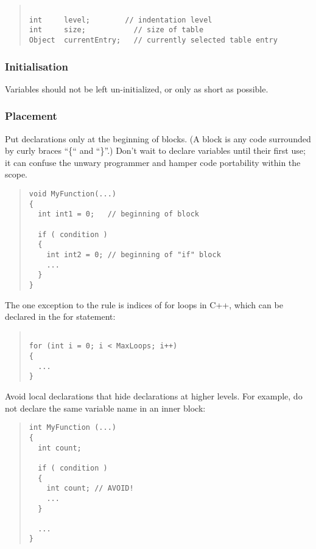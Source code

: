 \documentclass{article}
\begin{document}
\begin{quote}
\begin{verbatim}

int     level;	      // indentation level              
int     size;	        // size of table                  
Object  currentEntry;	// currently selected table entry 

\end{verbatim}
\end{quote}
 

\subsubsection{Initialisation}

Variables should not be left un-initialized, or only as short as
possible.


\subsubsection{Placement}

Put declarations only at the beginning of blocks. (A block is any code
surrounded by curly braces ``\{`` and ``\}''.) Don't wait to declare
variables until their first use; it can confuse the unwary programmer
and hamper code portability within the scope.

\begin{quote}
\begin{verbatim}
void MyFunction(...) 
{
  int int1 = 0;   // beginning of block

  if ( condition ) 
  {
    int int2 = 0; // beginning of "if" block
    ...
  }
}

\end{verbatim}
\end{quote}

The one exception to the rule is indices of for loops in C++, which 
can be declared in the for statement:

\begin{quote}
\begin{verbatim}

for (int i = 0; i < MaxLoops; i++) 
{ 
  ... 
}

\end{verbatim}
\end{quote}

Avoid local declarations that hide declarations at higher levels. For
example, do not declare the same variable name in an inner block:

\begin{quote}
\begin{verbatim}
int MyFunction (...) 
{
  int count;
  
  if ( condition ) 
  {
    int count; // AVOID!
    ...
  }

  ...
}
\end{verbatim}
\end{quote}
\end{document}
